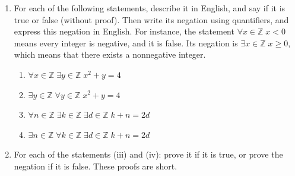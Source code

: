 \documentclass{article}
\newcommand{\Z}{\mathbb{Z}}
\theoremstyle{definition}
\begin{document}
\begin{question}
\begin{enumerate}
	\item For each of the following statements, describe it in English, and say if it is true or false (without proof). Then write its negation using quantifiers, and express this negation in English. For instance, the statement $\forall x \in \Z \; x < 0$ means every integer is negative, and it is false. Its negation is $\exists x \in \Z \; x \geq 0$, which means that there exists a nonnegative integer.
	
	\begin{enumerate}
		\item $\forall x \in \Z \; \exists y \in \Z \; x^2 + y = 4$
		\item $\exists y \in \Z \; \forall y \in \Z \; x^2 + y = 4$
		\item $\forall n \in \Z \; \exists k \in \Z \; \exists d \in \Z \; k+ n = 2d$
		\item $\exists n \in \Z \; \forall k \in \Z \; \exists d \in \Z \; k+ n = 2d$
	\end{enumerate}
	
	\item For each of the statements (iii) and (iv): prove it if it is true, or prove the negation if it is false. These proofs are short.
\end{enumerate}
\end{question}
\end{document}
